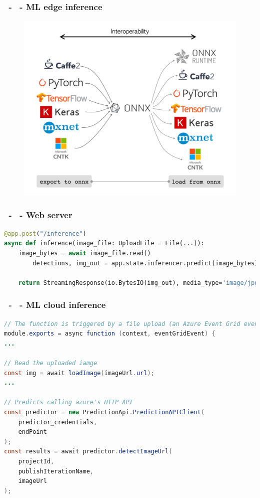 \documentclass{beamer}
\begin{document}
\begin{frame}
\frametitle{\secname\ - \subsecname\ - ML edge inference}
\begin{figure}
    \includegraphics[width=0.7\linewidth]{Imagens/onnx.png}
\end{figure}
\end{frame}

\begin{frame}[fragile]
\frametitle{\secname\ - \subsecname\ - Web server}
    \begin{lstlisting}[language=Python]
@app.post("/inference")
async def inference(image_file: UploadFile = File(...)):
    image_bytes = await image_file.read()
        detections, img_out = app.state.inferencer.predict(image_bytes)

    return StreamingResponse(io.BytesIO(img_out), media_type='image/jpg', headers={'detections': json.dumps(detections)})
    \end{lstlisting}
\end{frame}

\begin{frame}[fragile]
\frametitle{\secname\ - \subsecname\ - ML cloud inference}
    \begin{lstlisting}[language=Java]
// The function is triggered by a file upload (an Azure Event Grid event)
module.exports = async function (context, eventGridEvent) {
...

// Read the uploaded iamge
const img = await loadImage(imageUrl.url);
...

// Predicts calling azure's HTTP API
const predictor = new PredictionApi.PredictionAPIClient(
    predictor_credentials,
    endPoint
);
const results = await predictor.detectImageUrl(
    projectId,
    publishIterationName,
    imageUrl
);
    \end{lstlisting}
\end{frame}
\end{document}

